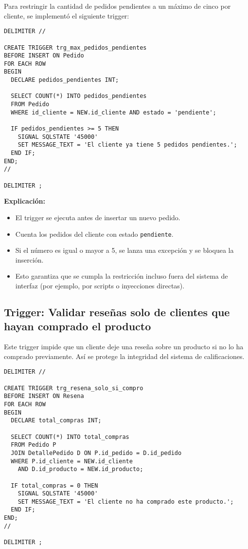 Para restringir la cantidad de pedidos pendientes a un máximo de cinco por cliente, se implementó el siguiente trigger:

\begin{lstlisting}
DELIMITER //

CREATE TRIGGER trg_max_pedidos_pendientes
BEFORE INSERT ON Pedido
FOR EACH ROW
BEGIN
  DECLARE pedidos_pendientes INT;

  SELECT COUNT(*) INTO pedidos_pendientes
  FROM Pedido
  WHERE id_cliente = NEW.id_cliente AND estado = 'pendiente';

  IF pedidos_pendientes >= 5 THEN
    SIGNAL SQLSTATE '45000'
    SET MESSAGE_TEXT = 'El cliente ya tiene 5 pedidos pendientes.';
  END IF;
END;
//

DELIMITER ;
\end{lstlisting}

\textbf{Explicación:}

\begin{itemize}
  \item El trigger se ejecuta antes de insertar un nuevo pedido.
  \item Cuenta los pedidos del cliente con estado \texttt{pendiente}.
  \item Si el número es igual o mayor a 5, se lanza una excepción y se bloquea la inserción.
  \item Esto garantiza que se cumpla la restricción incluso fuera del sistema de interfaz (por ejemplo, por scripts o inyecciones directas).
\end{itemize}

\subsection{Trigger: Validar reseñas solo de clientes que hayan comprado el producto}

Este trigger impide que un cliente deje una reseña sobre un producto si no lo ha comprado previamente. Así se protege la integridad del sistema de calificaciones.

\begin{lstlisting}
DELIMITER //

CREATE TRIGGER trg_resena_solo_si_compro
BEFORE INSERT ON Resena
FOR EACH ROW
BEGIN
  DECLARE total_compras INT;

  SELECT COUNT(*) INTO total_compras
  FROM Pedido P
  JOIN DetallePedido D ON P.id_pedido = D.id_pedido
  WHERE P.id_cliente = NEW.id_cliente
    AND D.id_producto = NEW.id_producto;

  IF total_compras = 0 THEN
    SIGNAL SQLSTATE '45000'
    SET MESSAGE_TEXT = 'El cliente no ha comprado este producto.';
  END IF;
END;
//

DELIMITER ;
\end{lstlisting}

